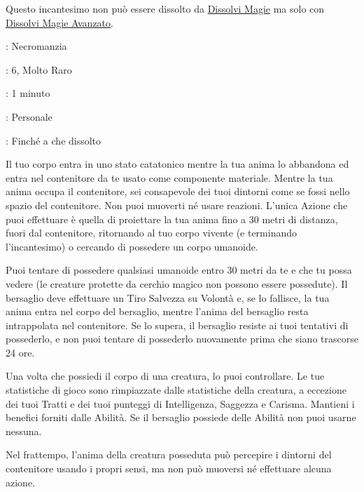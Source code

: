 \begin{multicols}{2}
Questo incantesimo non può essere dissolto da \hyperlink{dissolvimagie}{Dissolvi Magie} ma solo con \hyperlink{dissolvimagieavanzato}{Dissolvi Magie Avanzato}.

\noindent\colorbox{OBSSgold!10}{
\begin{minipage}{0.95\linewidth}
\begin{description}[noitemsep, topsep=0pt, parsep=0pt, partopsep=0pt, leftmargin=0cm, labelwidth=1.3cm]
	\item[\textbf{Lista}]: Necromanzia
	\item[\textbf{Livello}]: 6, Molto Raro
	\item[\textbf{Lancio}]: 1 minuto
	\item[\textbf{Gittata}]: Personale
	\item[\textbf{Durata}]: Finché a che dissolto
\end{description}
\end{minipage}}\smallskip

Il tuo corpo entra in uno stato catatonico mentre la tua anima lo abbandona ed entra nel contenitore da te usato come componente materiale. Mentre la tua anima occupa il contenitore, sei consapevole dei tuoi dintorni come se fossi nello spazio del contenitore. Non puoi muoverti né usare reazioni. L'unica Azione che puoi effettuare è quella di proiettare la tua anima fino a 30 metri di distanza, fuori dal contenitore, ritornando al tuo corpo vivente (e terminando l'incantesimo) o cercando di possedere un corpo umanoide.

Puoi tentare di possedere qualsiasi umanoide entro 30 metri da te e che tu possa vedere (le creature protette da cerchio magico non possono essere possedute). Il bersaglio deve effettuare un Tiro Salvezza su Volontà e, se lo fallisce, la tua anima entra nel corpo del bersaglio, mentre l'anima del bersaglio resta intrappolata nel contenitore. Se lo supera, il bersaglio resiste ai tuoi tentativi di possederlo, e non puoi tentare di possederlo nuovamente prima che siano trascorse 24 ore.

Una volta che possiedi il corpo di una creatura, lo puoi controllare. Le tue statistiche di gioco sono rimpiazzate dalle statistiche della creatura, a eccezione dei tuoi Tratti e dei tuoi punteggi di Intelligenza, Saggezza e Carisma. Mantieni i benefici forniti dalle Abilità. Se il bersaglio possiede delle Abilità non puoi usarne nessuna.

Nel frattempo, l'anima della creatura posseduta può percepire i dintorni del contenitore usando i propri sensi, ma non può muoversi né effettuare alcuna azione.


\end{multicols}
